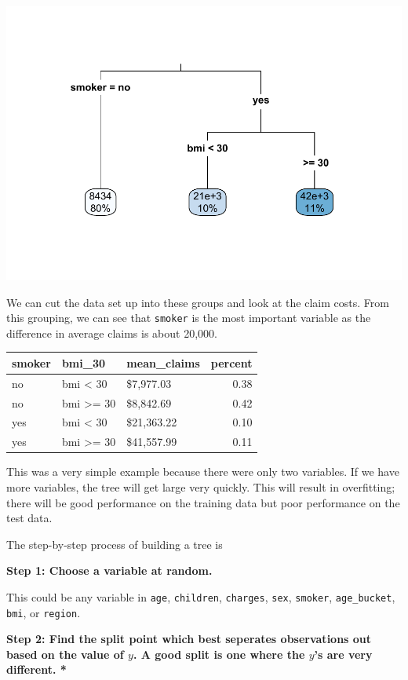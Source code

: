 \documentclass[openany]{book}
\begin{document}
\includegraphics{06-tree-based-models_files/figure-latex/unnamed-chunk-2-1.pdf}

We can cut the data set up into these groups and look at the claim costs. From this grouping, we can see that \texttt{smoker} is the most important variable as the difference in average claims is about 20,000.

\begin{longtable}[]{@{}lllr@{}}
\toprule
smoker & bmi\_30 & mean\_claims & percent\tabularnewline
\midrule
\endhead
no & bmi \textless{} 30 & \$7,977.03 & 0.38\tabularnewline
no & bmi \textgreater= 30 & \$8,842.69 & 0.42\tabularnewline
yes & bmi \textless{} 30 & \$21,363.22 & 0.10\tabularnewline
yes & bmi \textgreater= 30 & \$41,557.99 & 0.11\tabularnewline
\bottomrule
\end{longtable}

This was a very simple example because there were only two variables. If we have more variables, the tree will get large very quickly. This will result in overfitting; there will be good performance on the training data but poor performance on the test data.

The step-by-step process of building a tree is

\textbf{Step 1: Choose a variable at random.}

This could be any variable in \texttt{age}, \texttt{children}, \texttt{charges}, \texttt{sex}, \texttt{smoker}, \texttt{age\_bucket}, \texttt{bmi}, or \texttt{region}.

\textbf{Step 2: Find the split point which best seperates observations out based on the value of \(y\). A good split is one where the \(y\)'s are very different. * }
\end{document}
